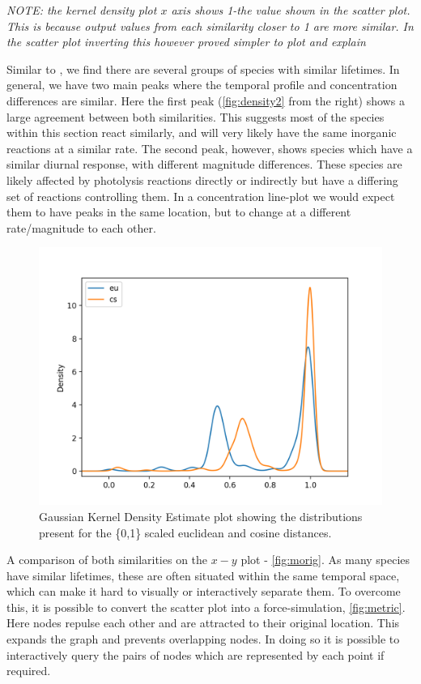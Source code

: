 \textit{NOTE: the kernel density plot $x$ axis shows 1-the value shown in the scatter plot. This is because output values from each similarity closer to 1 are more similar. In the scatter plot inverting this however proved simpler to plot and explain}

Similar to \cite{lifetime}, we find there are several groups of species with similar lifetimes. In general, we have two main peaks where the temporal profile and concentration differences are similar. Here the first peak (\autoref{fig:density2} from the right) shows a large agreement between both similarities. This suggests most of the species within this section react similarly, and will very likely have the same inorganic reactions at a similar rate. The second peak, however, shows species which have a similar diurnal response, with different magnitude differences. These species are likely affected by photolysis reactions directly or indirectly but have a differing set of reactions controlling them. In a concentration line-plot we would expect them to have peaks in the same location, but to change at a different rate/magnitude to each other. 


\begin{figure}[H]
    \centering
\includegraphics[width=.7\textwidth]{fig/metric_density.png}
\caption{Gaussian Kernel Density Estimate plot showing the distributions present for the \{0,1\} scaled euclidean and cosine distances.}
\label{fig:density2}
\end{figure}



A comparison of both similarities on the $x-y$ plot -  \autoref{fig:morig}. As many species have similar lifetimes, these are often situated within the same temporal space, which can make it hard to visually or interactively separate them. To overcome this, it is possible to convert the scatter plot into a force-simulation, \autoref{fig:metric}. Here nodes repulse each other and are attracted to their original location. This expands the graph and prevents overlapping nodes. In doing so it is possible to interactively query the pairs of nodes which are represented by each point if required. 




